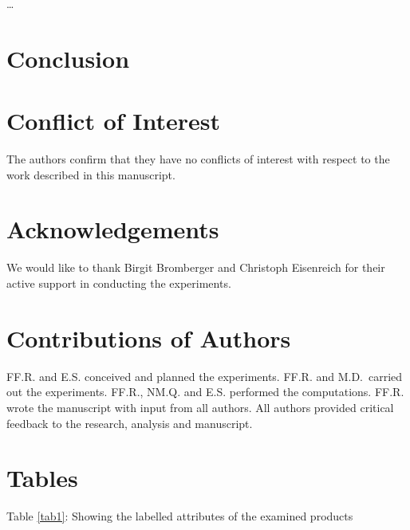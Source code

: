 \documentclass[preprint, 3p,
authoryear]{elsarticle} %
\begin{document}
\ldots{}

\hypertarget{conclusion}{%
\section{Conclusion}\label{conclusion}}

\hypertarget{conflict-of-interest}{%
\section{Conflict of Interest}\label{conflict-of-interest}}

The authors confirm that they have no conflicts of interest with respect
to the work described in this manuscript.

\hypertarget{acknowledgements}{%
\section{Acknowledgements}\label{acknowledgements}}

We would like to thank Birgit Bromberger and Christoph Eisenreich for
their active support in conducting the experiments.

\hypertarget{contributions-of-authors}{%
\section{Contributions of Authors}\label{contributions-of-authors}}

FF.R. and E.S. conceived and planned the experiments. FF.R. and
M.D.~carried out the experiments. FF.R., NM.Q. and E.S. performed the
computations. FF.R. wrote the manuscript with input from all authors.
All authors provided critical feedback to the research, analysis and
manuscript.

\hypertarget{tables}{%
\section{Tables}\label{tables}}

Table \ref{tab1}: Showing the labelled attributes of the examined
products

\singlespacing
\end{document}
